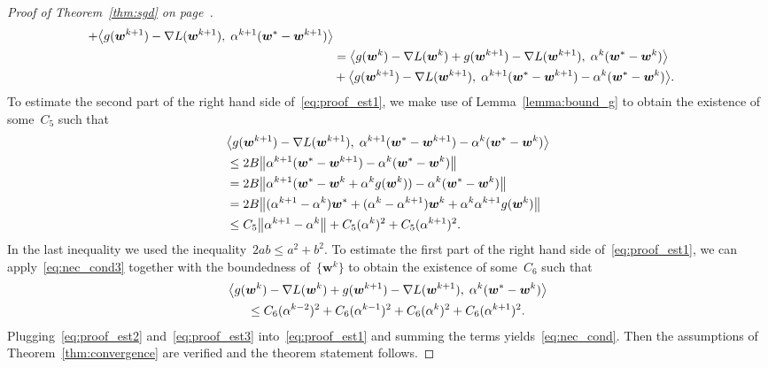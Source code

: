 \begin{proof}[Proof of Theorem~\ref{thm:sgd} on page~\pageref{thm:sgd}]
\begin{equation}
\begin{aligned}
        + \inner{ g(\bm{w}^{k+1})-\nabla L(\bm{w}^{k+1})}{\alpha^{k+1}(\bm{w}^*-\bm{w}^{k+1})} \\
      & = \inner{ g(\bm{w}^{k})-\nabla L(\bm{w}^{k}) + g(\bm{w}^{k+1})-\nabla L(\bm{w}^{k+1})}{\alpha^k(\bm{w}^*-\bm{w}^{k})} \\
      & + \inner{ g(\bm{w}^{k+1})-\nabla L(\bm{w}^{k+1})}{\alpha^{k+1}(\bm{w}^*-\bm{w}^{k+1})-\alpha^k(\bm{w}^*-\bm{w}^{k})}.
    \end{aligned}
  \end{equation}
  To estimate the second part of the right hand side of~\eqref{eq:proof_est1}, we make use of Lemma~\ref{lemma:bound_g} to obtain the existence of some~$C_5$ such that
  \begin{equation}\label{eq:proof_est2}
    \begin{aligned}
    & \inner{ g(\bm{w}^{k+1})
    -\nabla L(\bm{w}^{k+1})}{\alpha^{k+1}(\bm{w}^*-\bm{w}^{k+1})-\alpha^k(\bm{w}^*-\bm{w}^{k})} \\
    & \leq 2B\norm{\alpha^{k+1}(\bm{w}^*-\bm{w}^{k+1})-\alpha^k(\bm{w}^*-\bm{w}^{k})} \\
    & = 2B\norm{\alpha^{k+1}(\bm{w}^*-\bm{w}^k+\alpha^kg(\bm{w}^k))-\alpha^k(\bm{w}^*-\bm{w}^{k})} \\
    & = 2B\norm{(\alpha^{k+1}-\alpha^k)\bm{w}^* + (\alpha^k-\alpha^{k+1})\bm{w}^k +\alpha^k\alpha^{k+1} g(\bm{w}^k)} \\
    & \leq C_5 \norm{\alpha^{k+1}-\alpha^k} + C_5(\alpha^k)^2 + C_5(\alpha^{k+1})^2.
    \end{aligned}
  \end{equation}
  In the last inequality we used the inequality~$2ab\leq a^2+b^2$. To estimate the first part of the right hand side of~\eqref{eq:proof_est1}, we can apply~\eqref{eq:nec_cond3} together with the boundedness of~$\{\bm{w}^k\}$ to obtain the existence of some~$C_6$ such that
  \begin{multline}\label{eq:proof_est3}
    \inner{ g(\bm{w}^{k}) -\nabla L(\bm{w}^{k}) + g(\bm{w}^{k+1})-\nabla L(\bm{w}^{k+1})}{\alpha^k(\bm{w}^* - \bm{w}^{k})} \\
      \leq C_6(\alpha^{k-2})^2 + C_6(\alpha^{k-1})^2 + C_6(\alpha^{k})^2 + C_6(\alpha^{k+1})^2.
  \end{multline}
  Plugging~\eqref{eq:proof_est2} and~\eqref{eq:proof_est3} into~\eqref{eq:proof_est1} and summing the terms yields~\eqref{eq:nec_cond}. Then the assumptions of Theorem~\ref{thm:convergence} are verified and the theorem statement follows.
\end{proof}

